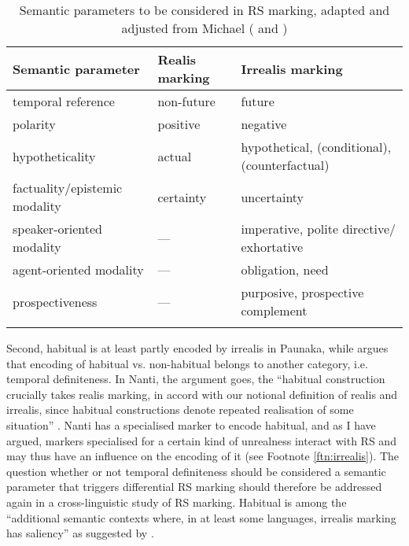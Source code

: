 \begin{table}
\caption[Semantic parameters to be considered in RS marking]{Semantic parameters to be considered in RS marking, adapted and adjusted from Michael (\citeyear[252, 266]{Michael2014} and \citeyear[189]{Michael2014a})}

\begin{tabularx}{\textwidth}{QlQ}
\lsptoprule
Semantic parameter & Realis marking & Irrealis marking \\
\midrule
temporal reference & non-future & future \\
\tablevspace
polarity & positive & negative \\
\tablevspace
hypotheticality & actual & hypothetical, (conditional), (counterfactual) \\
\tablevspace
factuality/epistemic modality & certainty & uncertainty \\
\tablevspace
speaker-oriented modality & --- & imperative, polite directive/ exhortative \\
\tablevspace
agent-oriented modality & --- & obligation, need \\
\tablevspace
prospectiveness & --- & purposive, prospective complement \\
\lspbottomrule
\end{tabularx}

\label{table:Michael_RS_semantics}
\end{table}


Second, habitual is at least partly encoded by irrealis in Paunaka, while \citet[284]{Michael2014} argues that encoding of habitual vs. non-habitual belongs to another category, i.e. temporal definiteness. In Nanti, the argument goes, the “habitual construction crucially takes realis marking, in accord with our notional definition of realis and irrealis, since habitual constructions denote repeated realisation of some situation” \citep[271]{Michael2014}. Nanti has a specialised marker to encode habitual, and as I have argued, markers specialised for a certain kind of unrealness interact with RS and may thus have an influence on the encoding of it (see Footnote \ref{ftn:irrealis}). The question whether or not temporal definiteness should be considered a semantic parameter that triggers differential RS marking should therefore be addressed again in a cross-linguistic study of RS marking. Habitual is among the “additional semantic contexts where, in at least some languages, irrealis marking has saliency” as suggested by \citet[70]{Elliott2000}.

